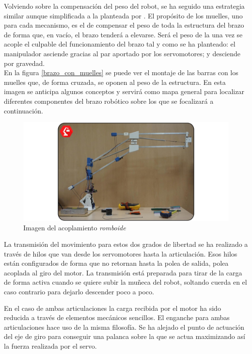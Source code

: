    Volviendo sobre la compensación del peso del robot, se ha seguido una estrategia similar aunque simplificada a la planteada por \cite{Rahman_asimple}. El propósito de los muelles, uno para cada mecanismo, es el de compensar el peso de toda la estructura del brazo de forma que, en vacío, el brazo tenderá a elevarse. Será el peso de la  una vez se acople el culpable del funcionamiento del brazo tal y como se ha planteado: el manipulador asciende gracias al par aportado por los servomotores; y desciende por gravedad.
    \\

    En la figura \ref{brazo_con_muelles} se puede ver el montaje de las barras con los muelles que, de forma cruzada, se oponen al peso de la estructura. En esta imagen se anticipa algunos conceptos y servirá como mapa general para localizar diferentes componentes del brazo robótico sobre los que se focalizará a continuación.

    \begin{figure}[H]
        \centering
        \includegraphics[width=\textwidth]{figuras/Imagenes_Mecanica/foto_brazo_10.jpg}
        \caption{Imagen del acoplamiento \textit{romboide}}
        \label{fig:Mecanica:brazo_con_muelles}
    \end{figure}


    La transmisión del movimiento para estos dos grados de libertad se ha realizado a través de hilos que van desde los servomotores hasta la articulación. Esos hilos están configurados de forma que no retornan hasta la polea de salida, polea acoplada al giro del motor. La transmisión está preparada para tirar de la carga de forma activa cuando se quiere subir la muñeca del robot, soltando cuerda en el caso contrario para dejarlo descender poco a poco.

    En el caso de ambas articulaciones la carga recibida por el motor ha sido reducida a través de elementos mecánicos sencillos. El enganche para ambas articulaciones hace uso de la misma filosofía. Se ha alejado el punto de actuación del eje de giro para conseguir una palanca sobre la que se actua maximizando así la fuerza realizada por el servo.
    \\

